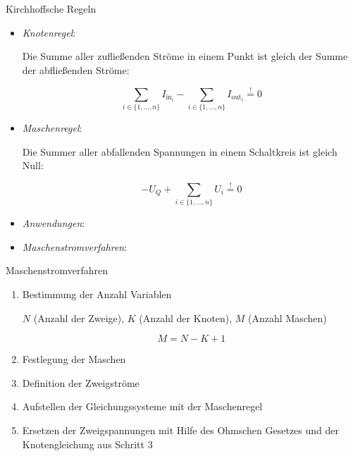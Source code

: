 \begin{defi}{Kirchhoffsche Regeln}
    \begin{itemize}
        \item \emph{Knotenregel}:

              Die Summe aller zufließenden Ströme in einem Punkt ist gleich der Summe der abfließenden Ströme:

              \[
                  \sum_{i \in \{1, \ldots, n\}} I_{\text{in}_i} - \sum_{i \in \{1, \ldots, n\}} I_{\text{out}_i} \stackrel{!}{=} 0
              \]
        \item \emph{Maschenregel}:

              Die Summer aller abfallenden Spannungen in einem Schaltkreis ist gleich Null:

              \[
                  - U_Q + \sum_{i \in \{1, \ldots, n\}} U_i \stackrel{!}{=} 0
              \]
        \item \emph{Anwendungen}:
        \item \emph{Maschenstromverfahren}:
    \end{itemize}
\end{defi}

\begin{bonus}{Maschenstromverfahren}
    \begin{enumerate}
        \item Bestimmung der Anzahl Variablen

              $N$ (Anzahl der Zweige), $K$ (Anzahl der Knoten), $M$ (Anzahl Maschen)

              \[
                  M = N - K + 1
              \]
        \item Festlegung der Maschen
        \item Definition der Zweigströme
        \item Aufstellen der Gleichungssysteme mit der Maschenregel
        \item Ersetzen der Zweigspannungen mit Hilfe des Ohmschen Gesetzes und der Knotengleichung aus Schritt 3
    \end{enumerate}
\end{bonus}

